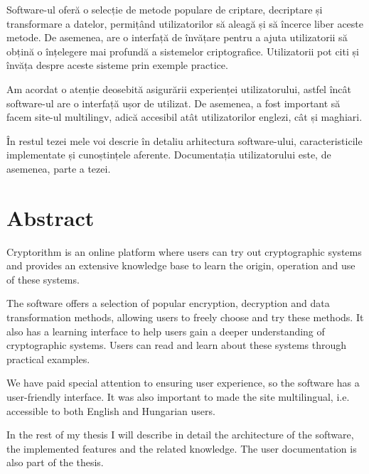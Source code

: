 Software-ul oferă o selecție de metode populare de criptare, decriptare și transformare a datelor, permițând utilizatorilor să aleagă și să încerce liber aceste metode. De asemenea, are o interfață de învățare pentru a ajuta utilizatorii să obțină o înțelegere mai profundă a sistemelor criptografice. Utilizatorii pot citi și învăța despre aceste sisteme prin exemple practice.

Am acordat o atenție deosebită asigurării experienței utilizatorului, astfel încât software-ul are o interfață ușor de utilizat. De asemenea, a fost important să facem site-ul multilingv, adică accesibil atât utilizatorilor englezi, cât și maghiari.

În restul tezei mele voi descrie în detaliu arhitectura software-ului, caracteristicile implementate și cunoștințele aferente. Documentația utilizatorului este, de asemenea, parte a tezei.
\vfill
{}

\chapter*{Abstract}

Cryptorithm is an online platform where users can try out cryptographic systems and provides an extensive knowledge base to learn the origin, operation and use of these systems.

The software offers a selection of popular encryption, decryption and data transformation methods, allowing users to freely choose and try these methods. It also has a learning interface to help users gain a deeper understanding of cryptographic systems. Users can read and learn about these systems through practical examples.

We have paid special attention to ensuring user experience, so the software has a user-friendly interface. It was also important to made the site multilingual, i.e. accessible to both English and Hungarian users.

In the rest of my thesis I will describe in detail the architecture of the software, the implemented features and the related knowledge. The user documentation is also part of the thesis.

\vfill
\dolgozatnyelve
{}